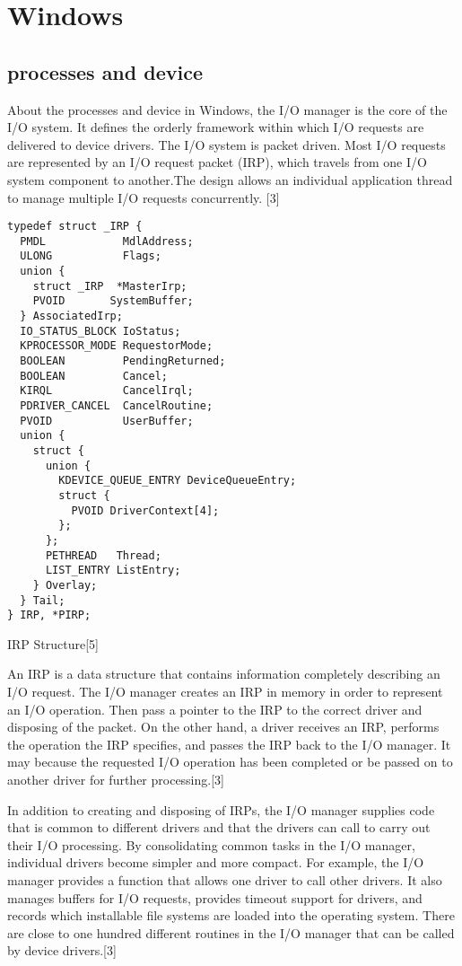 \documentclass[onecolumn, draftclsnofoot,10pt, compsoc]{IEEEtran}
\begin{document}
\section{Windows}
\subsection{processes and device}
About the processes and device in Windows, the I/O manager is the core of the I/O system. It defines the orderly framework within which I/O requests are delivered to device drivers. The I/O system is packet driven. Most I/O requests are represented by an I/O request packet (IRP), which travels from one I/O system component to another.The design allows an individual application thread to manage multiple I/O requests concurrently. [3]
\begin{lstlisting}
typedef struct _IRP {
  PMDL            MdlAddress;
  ULONG           Flags;
  union {
    struct _IRP  *MasterIrp;
    PVOID       SystemBuffer;
  } AssociatedIrp;
  IO_STATUS_BLOCK IoStatus;
  KPROCESSOR_MODE RequestorMode;
  BOOLEAN         PendingReturned;
  BOOLEAN         Cancel;
  KIRQL           CancelIrql;
  PDRIVER_CANCEL  CancelRoutine;
  PVOID           UserBuffer;
  union {
    struct {
      union {
        KDEVICE_QUEUE_ENTRY DeviceQueueEntry;
        struct {
          PVOID DriverContext[4];
        };
      };
      PETHREAD   Thread;
      LIST_ENTRY ListEntry;
    } Overlay;
  } Tail;
} IRP, *PIRP;
\end{lstlisting}
IRP Structure[5]

An IRP is a data structure that contains information completely describing an I/O request. The I/O manager creates an IRP in memory in order to represent an I/O operation. Then pass a pointer to the IRP to the correct driver and disposing of the packet. On the other hand, a driver receives an IRP, performs the operation the IRP specifies, and passes the IRP back to the I/O manager. It may because the requested I/O operation has been completed or be passed on to another driver for further processing.[3]

In addition to creating and disposing of IRPs, the I/O manager supplies code that is common to different drivers and that the drivers can call to carry out their I/O processing. By consolidating common tasks in the I/O manager, individual drivers become simpler and more compact. For example, the I/O manager provides a function that allows one driver to call other drivers. It also manages buffers for I/O requests, provides timeout support for drivers, and records which installable file systems are loaded into the operating system. There are close to one hundred different routines in the I/O manager that can be called by device drivers.[3]
\end{document}
